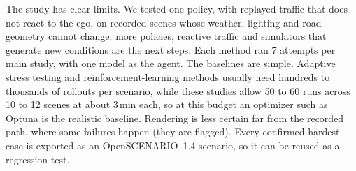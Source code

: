\documentclass[conference]{IEEEtran}
\begin{document}
The study has clear limits. We tested one policy, with replayed traffic that does not react to the ego, on recorded scenes whose weather, lighting and road geometry cannot change; more policies, reactive traffic and simulators that generate new conditions are the next steps. Each method ran 7 attempts per main study, with one model as the agent. The baselines are simple. Adaptive stress testing and reinforcement-learning methods usually need hundreds to thousands of rollouts per scenario, while these studies allow 50 to 60 runs across 10 to 12 scenes at about 3\,min each, so at this budget an optimizer such as Optuna is the realistic baseline. Rendering is less certain far from the recorded path, where some failures happen (they are flagged). Every confirmed hardest case is exported as an OpenSCENARIO~1.4 scenario, so it can be reused as a regression test.



\end{document}
